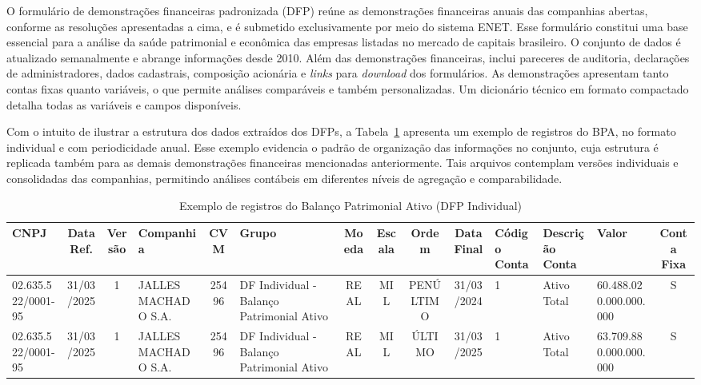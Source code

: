 O formulário de demonstrações financeiras padronizada (DFP) reúne as demonstrações financeiras anuais das companhias abertas, conforme as resoluções apresentadas a cima, e é submetido exclusivamente por meio do sistema ENET. Esse formulário constitui uma base essencial para a análise da saúde patrimonial e econômica das empresas listadas no mercado de capitais brasileiro. O conjunto de dados é atualizado semanalmente e abrange informações desde 2010. Além das demonstrações financeiras, inclui pareceres de auditoria, declarações de administradores, dados cadastrais, composição acionária e \textit{links} para \textit{download} dos formulários. As demonstrações apresentam tanto contas fixas quanto variáveis, o que permite análises comparáveis e também personalizadas. Um dicionário técnico em formato compactado detalha todas as variáveis e campos disponíveis.

Com o intuito de ilustrar a estrutura dos dados extraídos dos DFPs, a Tabela~\ref{tab:exemplo_bpa_individual} apresenta um exemplo de registros do BPA, no formato individual e com periodicidade anual. Esse exemplo evidencia o padrão de organização das informações no conjunto, cuja estrutura é replicada também para as demais demonstrações financeiras mencionadas anteriormente. Tais arquivos contemplam versões individuais e consolidadas das companhias, permitindo análises contábeis em diferentes níveis de agregação e comparabilidade.


\begin{table}[!htb]
	\centering
	\caption{Exemplo de registros do Balanço Patrimonial Ativo (DFP Individual)}
	\label{tab:exemplo_bpa_individual}
	\begin{tabularx}{\textwidth}{|l|c|c|X|c|X|c|c|c|c|X|X|X|c|}
		\hline
		\textbf{CNPJ} & \textbf{Data Ref.} & \textbf{Versão} & \textbf{Companhia} & \textbf{CVM} & \textbf{Grupo} & \textbf{Moeda} & \textbf{Escala} & \textbf{Ordem} & \textbf{Data Final} & \textbf{Código Conta} & \textbf{Descrição Conta} & \textbf{Valor} & \textbf{Conta Fixa} \\
		\hline
		02.635.522/0001-95 & 31/03/2025 & 1 & JALLES MACHADO S.A. & 25496 & DF Individual - Balanço Patrimonial Ativo & REAL & MIL & PENÚLTIMO & 31/03/2024 & 1 & Ativo Total & 60.488.020.000.000.000 & S \\
		\hline
		02.635.522/0001-95 & 31/03/2025 & 1 & JALLES MACHADO S.A. & 25496 & DF Individual - Balanço Patrimonial Ativo & REAL & MIL & ÚLTIMO & 31/03/2025 & 1 & Ativo Total & 63.709.880.000.000.000 & S \\
		\hline
	\end{tabularx}
\end{table}


